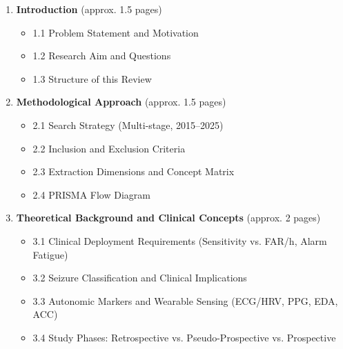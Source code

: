 \begin{enumerate}
  \item \textbf{Introduction} (approx. 1.5 pages)
    \begin{itemize}
      \item 1.1 Problem Statement and Motivation
      \item 1.2 Research Aim and Questions
      \item 1.3 Structure of this Review
    \end{itemize}
    
  \item \textbf{Methodological Approach} (approx. 1.5 pages)
    \begin{itemize}
      \item 2.1 Search Strategy (Multi-stage, 2015--2025)
      \item 2.2 Inclusion and Exclusion Criteria
      \item 2.3 Extraction Dimensions and Concept Matrix
      \item 2.4 PRISMA Flow Diagram
    \end{itemize}
    
  \item \textbf{Theoretical Background and Clinical Concepts} (approx. 2 pages)
    \begin{itemize}
      \item 3.1 Clinical Deployment Requirements (Sensitivity vs. FAR/h, Alarm Fatigue)
      \item 3.2 Seizure Classification and Clinical Implications
      \item 3.3 Autonomic Markers and Wearable Sensing (ECG/HRV, PPG, EDA, ACC)
      \item 3.4 Study Phases: Retrospective vs. Pseudo-Prospective vs. Prospective
    \end{itemize}
    

\end{enumerate}
